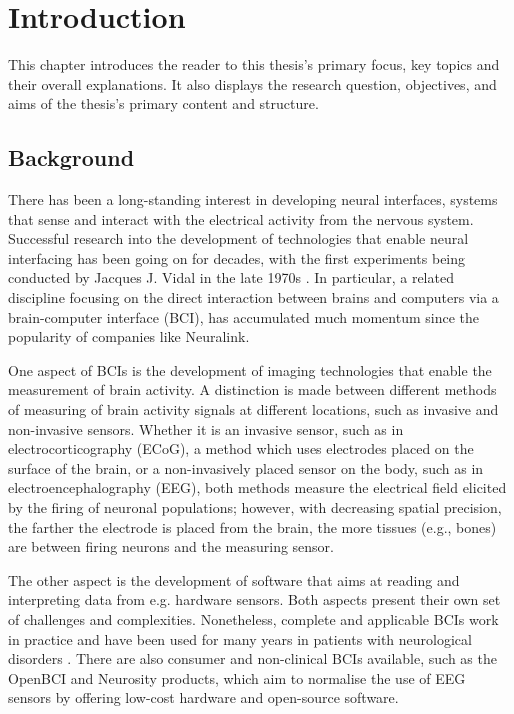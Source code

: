 \chapter{Introduction}
\graphicspath{{Chapter1/Figs/}{Chapter1/Figs/}}

This chapter introduces the reader to this thesis's primary focus, key topics and their overall explanations. It also displays the research question, objectives, and aims of the thesis's primary content and structure.

\section{Background}
\label{chapter1-background}

There has been a long-standing interest in developing neural interfaces, systems that sense and interact with the electrical activity from the nervous system. Successful research into the development of technologies that enable neural interfacing has been going on for decades, with the first experiments being conducted by Jacques J. Vidal in the late 1970s \citep{vidal_real-time_1977}. In particular, a related discipline focusing on the direct interaction between brains and computers via a brain-computer interface (BCI), has accumulated much momentum since the popularity of companies like Neuralink.

One aspect of BCIs is the development of imaging technologies that enable the measurement of brain activity. A distinction is made between different methods of measuring of brain activity signals at different locations, such as invasive and non-invasive sensors. Whether it is an invasive sensor, such as in electrocorticography (ECoG), a method which uses electrodes placed on the surface of the brain, or a non-invasively placed sensor on the body, such as in electroencephalography (EEG), both methods measure the electrical field elicited by the firing of neuronal populations; however, with decreasing spatial precision, the farther the electrode is placed from the brain, the more tissues (e.g., bones) are between firing neurons and the measuring sensor.

The other aspect is the development of software that aims at reading and interpreting data from e.g. hardware sensors. Both aspects present their own set of challenges and complexities. Nonetheless, complete and applicable BCIs work in practice and have been used for many years in patients with neurological disorders \citep{braingate_publications_nodate}. There are also consumer and non-clinical BCIs available, such as the OpenBCI and Neurosity products, which aim to normalise the use of EEG sensors by offering low-cost hardware and open-source software.

